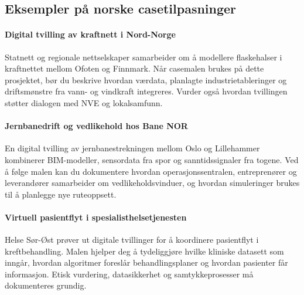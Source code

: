 \subsection{Eksempler på norske casetilpasninger}
\paragraph{Digital tvilling av kraftnett i Nord-Norge}
Statnett og regionale nettselskaper samarbeider om å modellere flaskehalser i kraftnettet mellom Ofoten og Finnmark. Når casemalen brukes på dette prosjektet, bør du beskrive hvordan værdata, planlagte industrietableringer og driftsmønstre fra vann- og vindkraft integreres. Vurder også hvordan tvillingen støtter dialogen med NVE og lokalsamfunn.

\paragraph{Jernbanedrift og vedlikehold hos Bane NOR}
En digital tvilling av jernbanestrekningen mellom Oslo og Lillehammer kombinerer BIM-modeller, sensordata fra spor og sanntidssignaler fra togene. Ved å følge malen kan du dokumentere hvordan operasjonssentralen, entreprenører og leverandører samarbeider om vedlikeholdsvinduer, og hvordan simuleringer brukes til å planlegge nye ruteoppsett.

\paragraph{Virtuell pasientflyt i spesialisthelsetjenesten}
Helse Sør-Øst prøver ut digitale tvillinger for å koordinere pasientflyt i kreftbehandling. Malen hjelper deg å tydeliggjøre hvilke kliniske datasett som inngår, hvordan algoritmer foreslår behandlingsplaner og hvordan pasienter får informasjon. Etisk vurdering, datasikkerhet og samtykkeprosesser må dokumenteres grundig.

